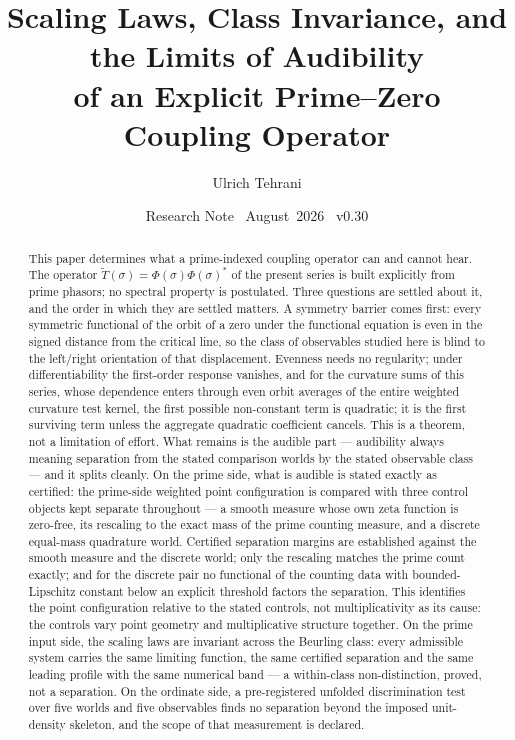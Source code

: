 \documentclass[11pt]{article}
\title{\vspace{-1.5em}\bfseries Scaling Laws, Class Invariance, and the
Limits of Audibility\\[0.4em]
\large of an Explicit Prime--Zero Coupling Operator}
\author{Ulrich Tehrani}
\date{Research Note \textperiodcentered\ August~2026
      \textperiodcentered\ v0.30}
\newcommand{\Tt}{\widetilde{T}}
\begin{document}
\maketitle

\begin{abstract}
This paper determines what a prime-indexed coupling operator can and cannot
hear. The operator $\Tt(\sigma)=\Phi(\sigma)\Phi(\sigma)^*$ of the present
series is built explicitly from prime phasors; no spectral property is
postulated. Three questions are settled about it, and the order in which they
are settled matters. A symmetry barrier comes first: every symmetric
functional of the orbit of a zero under the functional equation is even in the
signed distance from the critical line, so the class of observables studied
here is blind to the left/right orientation of that displacement. Evenness
needs no regularity; under differentiability the first-order response
vanishes, and for the curvature sums of this series, whose dependence enters
through even orbit averages of the entire weighted curvature test kernel, the
first
possible non-constant term is quadratic; it is the first surviving term unless the
aggregate quadratic coefficient cancels. This is a theorem, not a limitation
of effort. What
remains is the audible part --- audibility always meaning separation from
the stated comparison worlds by the stated observable class --- and it splits
cleanly. On the prime side, what
is audible is stated exactly as certified: the prime-side weighted point
configuration is compared with three control objects kept separate
throughout --- a smooth measure whose own zeta function is zero-free, its
rescaling to the exact mass of the prime counting measure, and a discrete
equal-mass quadrature world. Certified separation margins are established
against the smooth measure and the discrete world; only the rescaling
matches the prime count exactly;
and for the discrete pair no functional of the counting data with
bounded-Lipschitz constant below an explicit threshold factors the
separation. This identifies the point configuration relative to the stated
controls, not multiplicativity as its cause: the controls vary point geometry
and multiplicative structure together. On the prime input side, the scaling laws are invariant across the Beurling
class: every admissible system carries the same limiting function, the same
certified separation and the same leading profile with the same numerical
band --- a within-class non-distinction, proved, not a separation. On the
ordinate side, a pre-registered unfolded discrimination test over five worlds
and five observables finds no separation beyond the imposed unit-density
skeleton, and the scope of that measurement is declared.


\end{abstract}
\end{document}

